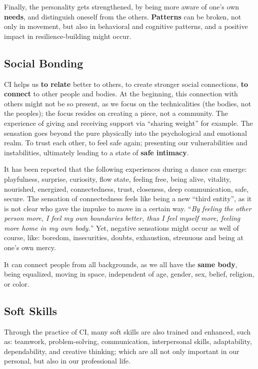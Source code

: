 Finally, the personality gets strengthened, by being more aware of one's own \textbf{needs}, and distinguish oneself from the others.
\textbf{Patterns} can be broken, not only in movement, but also in behavioral and cognitive patterns, and a positive impact in resilience-building might occur.

\subsection{Social Bonding}\label{subsec:social-bonding}

CI helps us \textbf{to relate} better to others, to create stronger social connections, \textbf{to connect} to other people and bodies.
At the beginning, this connection with others might not be so present, as we focus on the technicalities (the bodies, not the peoples); the focus resides on creating a piece, not a community.
The experience of giving and receiving support via ``sharing weight'' for example.
The sensation goes beyond the pure physically into the psychological and emotional realm.
To trust each other, to feel safe again; presenting our vulnerabilities and instabilities, ultimately leading to a state of \textbf{safe intimacy}.

It has been reported that the following experiences during a dance can emerge: playfulness, surprise, curiosity, flow state, feeling free, being alive, vitality, nourished, energized, connectedness, trust, closeness, deep communication, safe, secure.
The sensation of connectedness feels like being a new ``third entity'', as it is not clear who gave the impulse to move in a certain way.
``\textit{By feeling the other person more, I feel my own boundaries better, thus I feel myself more, feeling more home in my own body.}''
Yet, negative sensations might occur as well of course, like: boredom, insecurities, doubts, exhaustion, strenuous and being at one's own mercy.

It can connect people from all backgrounds, as we all have the \textbf{same body}, being equalized, moving in space, independent of age, gender, sex, belief, religion, or color.

\subsection{Soft Skills}\label{subsec:soft-skills}

Through the practice of CI, many soft skills are also trained and enhanced, such as: teamwork, problem-solving, communication, interpersonal skills, adaptability, dependability, and creative thinking; which are all not only important in our personal, but also in our professional life.

